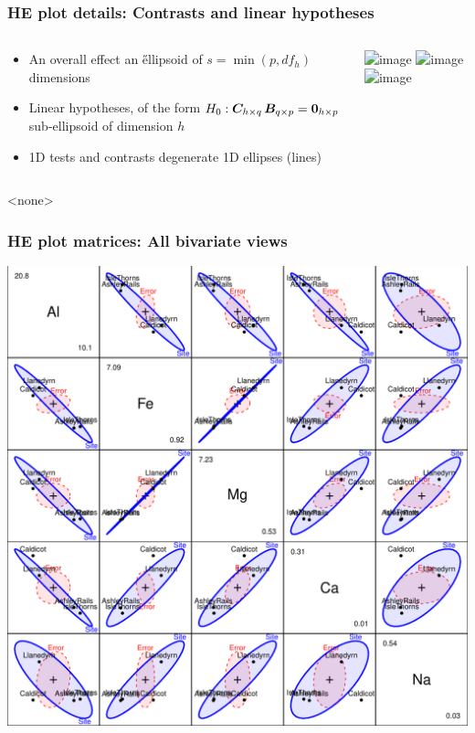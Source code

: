 \begin{frame}
	\frametitle{HE plot details: Contrasts and linear hypotheses}
  \begin{columns}[T]
    \begin{column}{.6\textwidth}
	  \begin{itemize}
	    \item<1-> An overall effect \implies an \H ellipsoid of
		$s = \min( p, df_h)$ dimensions
		\item<2-> Linear hypotheses, of the form 
		$H_0 : \bm{C}_{h \times q} \, \bm{B}_{q \times p} = \bm{0}_{h \times p}$
		\implies sub-ellipsoid of dimension $h$
		\item<3-> 1D tests and contrasts \implies degenerate 1D ellipses (lines)
	  \end{itemize}
    \end{column}
    \begin{column}{.4\textwidth}
    \includegraphics<1>[width=\textwidth,clip]{figures/pottery-HE2a}
    \includegraphics<2>[width=\textwidth,clip]{figures/pottery-HE2b}
    \includegraphics<3>[width=\textwidth,clip]{figures/pottery-HE2c}
    \end{column}
  \end{columns}
\end{frame}

\begin{frame}<none>
	\frametitle{HE plot matrices: All bivariate views}
	\begin{center}
      \includegraphics[height=.75\textheight,clip]{figures/pottery-HE3}
	  \\
	\end{center}
\end{frame}

